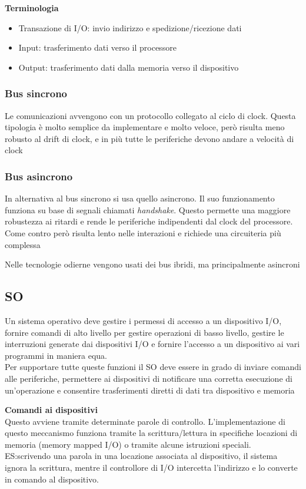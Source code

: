 \documentclass[12pt, a4paper]{article}
\begin{document}
\textbf{Terminologia}
\begin{itemize}
  \item Transazione di I/O: invio indirizzo e spedizione/ricezione dati
  \item Input: trasferimento dati verso il processore
  \item Output: trasferimento dati dalla memoria verso il dispositivo
\end{itemize}

\subsubsection{Bus sincrono}
Le comunicazioni avvengono con un protocollo collegato al ciclo di clock. Questa tipologia è molto semplice da 
implementare e molto veloce, però risulta meno robusto al drift di clock, e in più tutte le periferiche devono 
andare a velocità di clock

\subsubsection{Bus asincrono}
In alternativa al bus sincrono si usa quello asincrono. Il suo funzionamento funziona su base di segnali chiamati 
\textit{handshake}. Questo permette una maggiore robustezza ai ritardi e rende le periferiche indipendenti dal clock
del processore. Come contro però risulta lento nelle interazioni e richiede una circuiteria più complessa

Nelle tecnologie odierne vengono usati dei bus ibridi, ma principalmente asincroni

\subsection{SO}
Un sistema operativo deve gestire i permessi di accesso a un dispositivo I/O, fornire comandi di alto livello per
gestire operazioni di basso livello, gestire le interruzioni generate dai dispositivi I/O e fornire l'accesso a un 
dispositivo ai vari programmi in maniera equa.\\Per supportare tutte queste funzioni il SO deve essere in grado di 
inviare comandi alle periferiche, permettere ai dispositivi di notificare una corretta esecuzione di un'operazione e
consentire trasferimenti diretti di dati tra dispositivo e memoria

\textbf{Comandi ai dispositivi}\\Questo avviene tramite determinate parole di controllo. L'implementazione di questo
meccanismo funziona tramite la scrittura/lettura in specifiche locazioni di memoria (memory mapped I/O) o tramite
alcune istruzioni speciali.\\ES:scrivendo una parola in una locazione associata al dispositivo, il sistema ignora la 
scrittura, mentre il controllore di I/O intercetta l'indirizzo e lo converte in comando al dispositivo.
\end{document}
